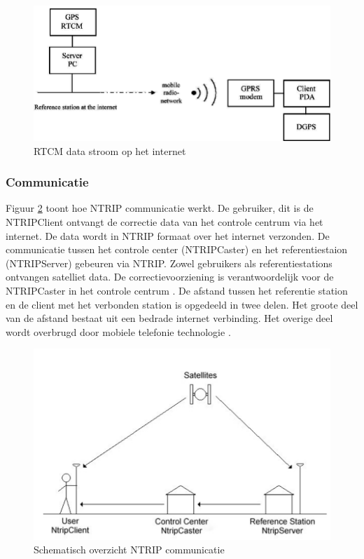 \begin{figure}[hpb]
	\includegraphics[scale=0.4]{NTRIP2.png}
	\caption{RTCM data stroom op het internet \cite{LBibNTRIP2}}
	\label{imgNTRIP2}
\end{figure} 

\subsubsection{Communicatie}
Figuur \ref{imgNTRIPCom} toont hoe NTRIP communicatie werkt. De gebruiker, dit is de NTRIPClient ontvangt de correctie data van het controle centrum via het internet. De data wordt in NTRIP formaat over het internet verzonden. De communicatie tussen het controle center (NTRIPCaster) en het referentiestaion (NTRIPServer) gebeuren via NTRIP. Zowel gebruikers als referentiestations ontvangen satelliet data. De correctievoorziening is verantwoordelijk voor de NTRIPCaster in het controle centrum \cite{LBibNTRIP4}. De afstand tussen het referentie station en de client met het verbonden station is opgedeeld in twee delen. Het groote deel van de afstand bestaat uit een bedrade internet verbinding. Het overige deel wordt overbrugd door mobiele telefonie technologie \cite{LBibNTRIP2}.

\begin{figure}[hpb]
	\includegraphics[scale=0.55]{NTRIPCommunication.png}
	\caption{Schematisch overzicht NTRIP communicatie \cite{LBibNTRIP4}}
	\label{imgNTRIPCom}
\end{figure}


